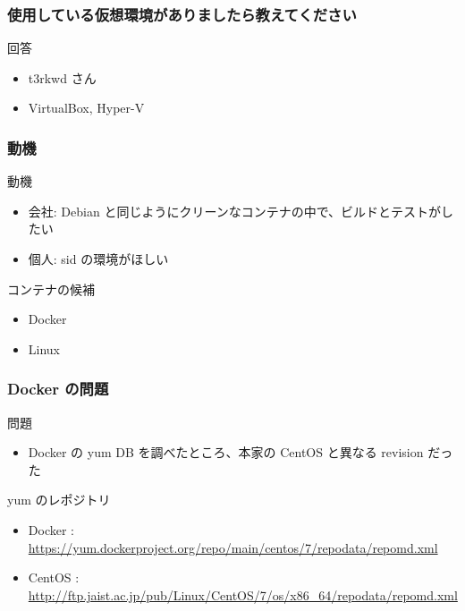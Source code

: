 \documentclass[cjk,dvipdfmx,12pt,compress,%
hyperref={bookmarks=true,bookmarksnumbered=true,bookmarksopen=false,%
colorlinks=false,%
pdftitle={第 120 回 関西 Debian 勉強会},%
pdfauthor={倉敷・のがた・佐々木・かわだ・おおつき},%
pdfsubject={資料},%
}]{beamer}
\begin{document}
\begin{frame}[fragile]
  \frametitle{使用している仮想環境がありましたら教えてください}
  \begin{block}{回答}
	\begin{itemize}
    \item t3rkwd さん
    \item VirtualBox, Hyper-V
	\end{itemize}
  \end{block}
\end{frame}



\begin{frame}[fragile]
  \frametitle{動機}
  \begin{block}{動機}
	\begin{itemize}
    \item 会社: Debian と同じようにクリーンなコンテナの中で、ビルドとテストがしたい
    \item 個人: sid の環境がほしい
	\end{itemize}
  \end{block}

  \begin{block}{コンテナの候補}
	\begin{itemize}
    \item Docker
    \item Linux
	\end{itemize}
  \end{block}
\end{frame}

\begin{frame}[fragile]
  \frametitle{ Docker の問題}
  \begin{block}{問題}
	\begin{itemize}
	\item  Docker の yum DB を調べたところ、本家の CentOS と異なる revision だった	
	\end{itemize}
  \end{block}

  \begin{block}{yum のレポジトリ}
	\begin{itemize}
	\item Docker : \url{https://yum.dockerproject.org/repo/main/centos/7/repodata/repomd.xml} 
	\item CentOS : \url{http://ftp.jaist.ac.jp/pub/Linux/CentOS/7/os/x86_64/repodata/repomd.xml}
	\end{itemize}
  \end{block}
\end{frame}
\end{document}
